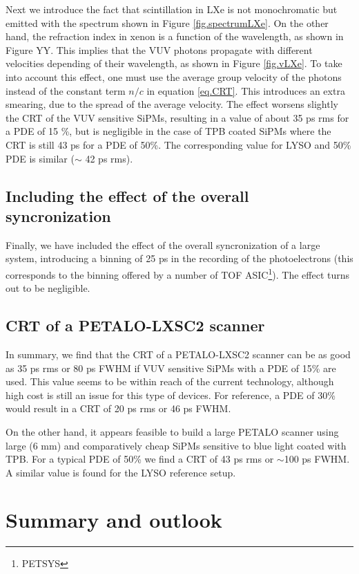 \documentclass[review]{elsarticle}
\begin{document}
  Next we introduce the fact that scintillation in LXe is not monochromatic but emitted with the spectrum shown in Figure \ref{fig.spectrumLXe}. On the other hand, the refraction index in xenon is a function of the wavelength, as shown in Figure YY. This implies that the VUV photons propagate with different velocities depending of their wavelength, as shown in Figure \ref{fig.vLXe}. To take into account this effect, one must use the average group velocity of the photons instead of the constant term $n/c$
in equation \ref{eq.CRT}. This introduces an extra smearing, due to the spread of the average velocity. The effect worsens slightly the CRT of the VUV sensitive SiPMs, resulting in a value of about 35 ps rms for a PDE of 15 \%, but is negligible in the case of TPB coated SiPMs where the CRT is still 43 ps for a PDE of 50\%. The corresponding value for LYSO and 50\% PDE is similar ($\sim$ 42 ps rms). 
  
  \subsection*{Including the effect of the overall syncronization}
  Finally, we have included the effect of the overall syncronization of a large system, introducing a binning of 25 ps in the recording of the photoelectrons (this corresponds to the binning offered by a number of TOF ASIC\footnote{PETSYS}). The effect turns out to be negligible.  
  
\subsection*{CRT of a PETALO-LXSC2 scanner}
In summary, we find that the CRT of a PETALO-LXSC2 scanner can be as good as 35 ps rms or 80 ps FWHM if VUV sensitive SiPMs with a PDE of 15\% are used. This value seems to be within reach of the current technology, although high cost is still an issue for this type of devices. For reference, a PDE of 30\% would result in a CRT of 20 ps rms or 46 ps FWHM. 

On the other hand, it appears feasible to build a large PETALO scanner using large (6 mm) and comparatively cheap SiPMs sensitive to blue light coated with TPB. For a typical PDE of 50\% we find a CRT of
43 ps rms or $\sim$100 ps FWHM. A similar value is found for the LYSO reference setup.


\section{Summary and outlook}\label{sec.conclu}
\end{document}
